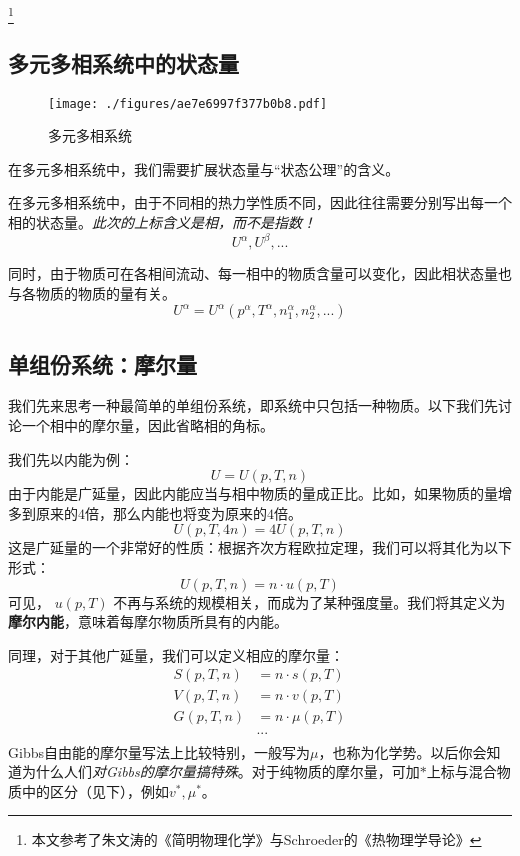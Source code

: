 
\begin{issues}
\issueDraft
\end{issues}


\footnote{本文参考了朱文涛的《简明物理化学》与Schroeder的《热物理学导论》}

\subsection{多元多相系统中的状态量}
\begin{figure}[ht]
\centering
\texttt{[image: ./figures/ae7e6997f377b0b8.pdf]}
\caption{多元多相系统} \label{fig_ParMol_1}
\end{figure}

在多元多相系统中，我们需要扩展状态量与“状态公理”的含义。

在多元多相系统中，由于不同相的热力学性质不同，因此往往需要分别写出每一个相的状态量。\textsl{此次的上标含义是相，而不是指数！}
$$U^\alpha, U^\beta,...$$

同时，由于物质可在各相间流动、每一相中的物质含量可以变化，因此相状态量也与各物质的物质的量有关。
$$U^\alpha = U^\alpha (p^\alpha, T^\alpha, n_1^\alpha,n_2^\alpha,...)$$

\subsection{单组份系统：摩尔量}
我们先来思考一种最简单的单组份系统，即系统中只包括一种物质。以下我们先讨论一个相中的摩尔量，因此省略相的角标。

我们先以内能为例：
$$U = U (p, T, n)$$
由于内能是广延量，因此内能应当与相中物质的量成正比。比如，如果物质的量增多到原来的$4$倍，那么内能也将变为原来的$4$倍。
$$U(p, T, 4 n) = 4 U (p, T, n)$$
这是广延量的一个非常好的性质：根据齐次方程欧拉定理，我们可以将其化为以下形式：
$$U(p, T, n) = n \cdot u (p, T)$$
可见， $u (p, T)$ 不再与系统的规模相关，而成为了某种强度量。我们将其定义为\textbf{摩尔内能}，意味着每摩尔物质所具有的内能。

同理，对于其他广延量，我们可以定义相应的摩尔量：
$$
\begin{aligned}
S(p, T, n) &= n \cdot s (p, T)\\
V(p, T, n) &= n \cdot v (p, T)\\
G(p, T, n) &= n \cdot \mu (p, T)\\
&...\\
\end{aligned}
$$
Gibbs自由能的摩尔量写法上比较特别，一般写为$\mu$，也称为化学势。以后你会知道为什么人们\textsl{对Gibbs的摩尔量搞特殊}。对于纯物质的摩尔量，可加$*$上标与混合物质中的区分（见下），例如$v^*, \mu^*$。

